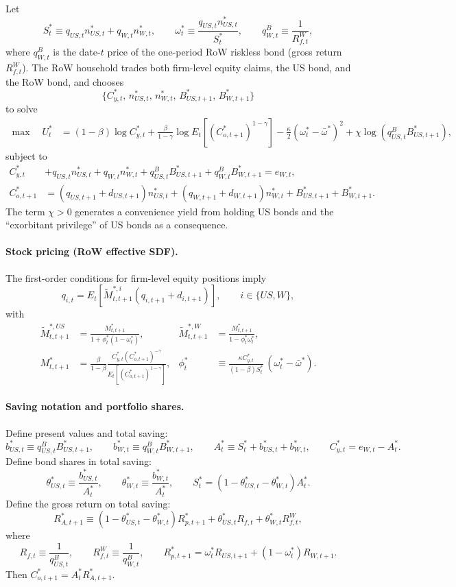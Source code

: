 \documentclass{article}
\begin{document}
Let
\[
S_t^* \equiv q_{US,t}n^*_{US,t}+q_{W,t}n^*_{W,t},
\qquad
\omega_t^* \equiv \frac{q_{US,t}n^*_{US,t}}{S_t^*},
\qquad
q^B_{W,t}\equiv \frac{1}{R_{f,t}^W},
\]
where $q^B_{W,t}$ is the date-$t$ price of the one-period RoW riskless bond (gross return $R_{f,t}^W$). The RoW household trades both firm-level equity claims, the US bond, and the RoW bond, and chooses
\[
\{C^*_{y,t},\,n^*_{US,t},\,n^*_{W,t},\,B^*_{US,t+1},\,B^*_{W,t+1}\}
\]
to solve
\begin{align*}
\max\quad U_t^*
&=
(1-\beta)\log C^*_{y,t}
+\frac{\beta}{1-\gamma}\log E_t\!\left[\left(C^*_{o,t+1}\right)^{1-\gamma}\right]
-\frac{\kappa}{2}\left(\omega_t^*-\bar\omega^*\right)^2
+\chi\log\!\left(q^B_{US,t}B^*_{US,t+1}\right),
\end{align*}
subject to
\begin{align*}
C^*_{y,t}
&+q_{US,t}n^*_{US,t}+q_{W,t}n^*_{W,t}
+q^B_{US,t}B^*_{US,t+1}+q^B_{W,t}B^*_{W,t+1}
= e_{W,t},\\
C^*_{o,t+1}
&=
(q_{US,t+1}+d_{US,t+1})n^*_{US,t}
+(q_{W,t+1}+d_{W,t+1})n^*_{W,t}
+B^*_{US,t+1}+B^*_{W,t+1}.
\end{align*}
The term $\chi>0$ generates a convenience yield from holding US bonds and the ``exorbitant privilege'' of US bonds as a consequence.

\paragraph{Stock pricing (RoW effective SDF).}
The first-order conditions for firm-level equity positions imply
\begin{equation}\label{RoW_stock_pricing}
q_{i,t}
=
E_t\!\left[\tilde M^{*,i}_{t,t+1}(q_{i,t+1}+d_{i,t+1})\right],
\qquad
i\in\{US,W\},
\end{equation}
with
\begin{align*}
\tilde M^{*,US}_{t,t+1}&=\frac{M^*_{t,t+1}}{1+\phi_t^*(1-\omega_t^*)},
&
\tilde M^{*,W}_{t,t+1}&=\frac{M^*_{t,t+1}}{1-\phi_t^*\omega_t^*},\\
M^*_{t,t+1}
&=\frac{\beta}{1-\beta}
\frac{C^*_{y,t}(C^*_{o,t+1})^{-\gamma}}{E_t\!\left[(C^*_{o,t+1})^{1-\gamma}\right]},
&
\phi_t^*
&\equiv \frac{\kappa C^*_{y,t}}{(1-\beta)S_t^*}\,(\omega_t^*-\bar\omega^*).
\end{align*}

\paragraph{Saving notation and portfolio shares.}
Define present values and total saving:
\[
b_{US,t}^*\equiv q^B_{US,t}B^*_{US,t+1},
\qquad
b_{W,t}^*\equiv q^B_{W,t}B^*_{W,t+1},
\qquad
A_t^*\equiv S_t^*+b_{US,t}^*+b_{W,t}^*,
\qquad
C^*_{y,t}=e_{W,t}-A_t^*.
\]
Define bond shares in total saving:
\[
\theta_{US,t}^*\equiv \frac{b_{US,t}^*}{A_t^*},
\qquad
\theta_{W,t}^*\equiv \frac{b_{W,t}^*}{A_t^*},
\qquad
S_t^*=(1-\theta_{US,t}^*-\theta_{W,t}^*)A_t^*.
\]
Define the gross return on total saving:
\[
R_{A,t+1}^*
\equiv
(1-\theta_{US,t}^*-\theta_{W,t}^*)R_{p,t+1}^*
+\theta_{US,t}^* R_{f,t}
+\theta_{W,t}^* R_{f,t}^W,
\]
where
\[
R_{f,t}\equiv \frac{1}{q^B_{US,t}},
\qquad
R_{f,t}^W\equiv \frac{1}{q^B_{W,t}},
\qquad
R_{p,t+1}^*=\omega_t^*R_{US,t+1}+(1-\omega_t^*)R_{W,t+1}.
\]
Then $C^*_{o,t+1}=A_t^*R_{A,t+1}^*$.
\end{document}
